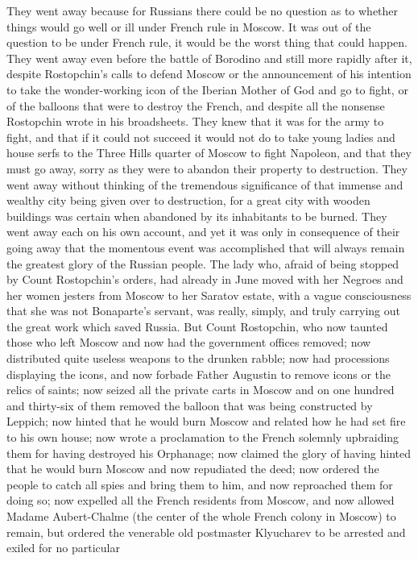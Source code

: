They went away because for Russians there could be no question as
to whether things would go well or ill under French rule in
Moscow. It was out of the question to be under French rule, it
would be the worst thing that could happen. They went away even
before the battle of Borodino and still more rapidly after it,
despite Rostopchin's calls to defend Moscow or the announcement
of his intention to take the wonder-working icon of the Iberian
Mother of God and go to fight, or of the balloons that were to
destroy the French, and despite all the nonsense Rostopchin wrote
in his broadsheets. They knew that it was for the army to fight,
and that if it could not succeed it would not do to take young
ladies and house serfs to the Three Hills quarter of Moscow to
fight Napoleon, and that they must go away, sorry as they were to
abandon their property to destruction. They went away without
thinking of the tremendous significance of that immense and
wealthy city being given over to destruction, for a great city
with wooden buildings was certain when abandoned by its
inhabitants to be burned. They went away each on his own account,
and yet it was only in consequence of their going away that the
momentous event was accomplished that will always remain the
greatest glory of the Russian people. The lady who, afraid of
being stopped by Count Rostopchin's orders, had already in June
moved with her Negroes and her women jesters from Moscow to her
Saratov estate, with a vague consciousness that she was not
Bonaparte's servant, was really, simply, and truly carrying out
the great work which saved Russia. But Count Rostopchin, who now
taunted those who left Moscow and now had the government offices
removed; now distributed quite useless weapons to the drunken
rabble; now had processions displaying the icons, and now forbade
Father Augustin to remove icons or the relics of saints; now
seized all the private carts in Moscow and on one hundred and
thirty-six of them removed the balloon that was being constructed
by Leppich; now hinted that he would burn Moscow and related how
he had set fire to his own house; now wrote a proclamation to the
French solemnly upbraiding them for having destroyed his
Orphanage; now claimed the glory of having hinted that he would
burn Moscow and now repudiated the deed; now ordered the people
to catch all spies and bring them to him, and now reproached them
for doing so; now expelled all the French residents from Moscow,
and now allowed Madame Aubert-Chalme (the center of the whole
French colony in Moscow) to remain, but ordered the venerable old
postmaster Klyucharev to be arrested and exiled for no particular
